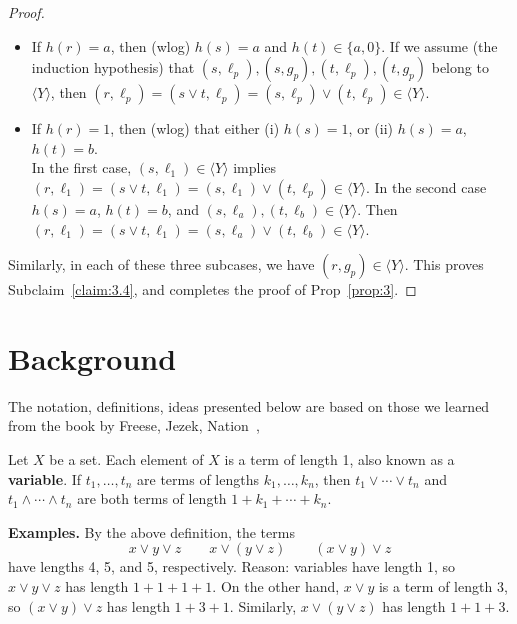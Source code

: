 \begin{proof}
\begin{itemize}
  \item If $h(r) = a$, then (wlog) $h(s) = a$ and $h(t) \in \{a, 0\}$.  If we assume (the induction hypothesis) that $(s, \ell_p), (s, g_p), (t, \ell_p), (t, g_p)$ belong to $\langle Y \rangle$, then $(r, \ell_p) = (s \vee t, \ell_p) =  (s, \ell_p) \vee (t, \ell_p) \in \langle Y \rangle$. 

  \item If $h(r) = 1$, then (wlog) that either (i) $h(s) = 1$, or (ii) $h(s) = a$, $h(t)=b$.\\
  In the first case, $(s, \ell_1) \in \langle Y \rangle$ implies 
  $(r, \ell_1) = (s \vee t, \ell_1) =  (s, \ell_1) \vee (t, \ell_p) \in \langle Y \rangle$.
  In the second case $h(s) = a$, $h(t) = b$, and
  $(s, \ell_a), (t, \ell_b) \in \langle Y \rangle$. Then
  $(r, \ell_1) = (s \vee t, \ell_1) =  (s, \ell_a) \vee (t, \ell_b) \in \langle Y \rangle$.

  \end{itemize}
Similarly, in each of these three subcases, we have $(r, g_p) \in \langle Y \rangle$.
This proves Subclaim~\ref{claim:3.4}, and completes the proof of Prop~\ref{prop:3}.
\end{proof}

\newpage

\section{Background}
The notation, definitions, ideas presented below are based on those 
we learned from the book by Freese, Jezek, Nation~\cite{MR1319815}, 


\begin{definition} Let $X$ be a set. Each element of $X$ is a 
  term of length 1, also known as a \textbf{variable}. 
  If $t_1, \dots, t_n$ are terms of lengths $k_1, \dots, k_n$, 
  then $t_1 \vee \cdots \vee t_n$ and $t_1 \wedge \cdots \wedge t_n$ are 
  both terms of length $1+ k_1 + \cdots + k_n$.
\end{definition}

\noindent \textbf{Examples.} By the above definition, the terms 
\[x \vee y \vee z \qquad x \vee (y \vee z) \qquad (x \vee y) \vee z\]
have lengths 4, 5, and 5, respectively. Reason: variables have length 1, 
so $x \vee y \vee z$ has length $1 + 1 + 1 + 1$.  On the other hand, 
$x\vee y$ is a term of length $3$, so $(x \vee y) \vee z$ has length 
$1 + 3 + 1$. Similarly, $x \vee (y \vee z)$ has length $1 + 1 + 3$.

